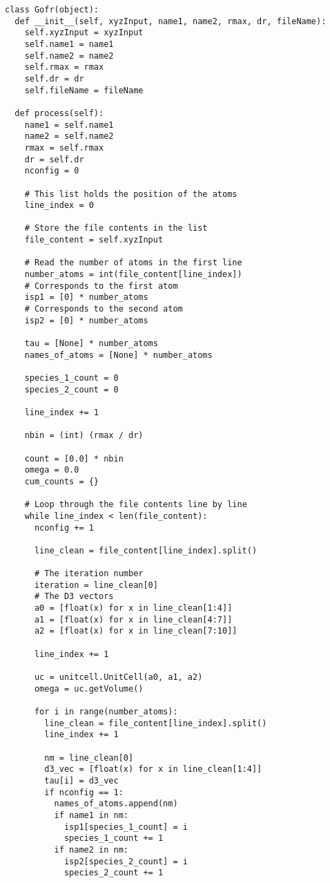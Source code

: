 \begin{verbatim}
class Gofr(object):
  def __init__(self, xyzInput, name1, name2, rmax, dr, fileName):
    self.xyzInput = xyzInput
    self.name1 = name1
    self.name2 = name2
    self.rmax = rmax
    self.dr = dr
    self.fileName = fileName
    
  def process(self):
    name1 = self.name1
    name2 = self.name2
    rmax = self.rmax
    dr = self.dr
    nconfig = 0
    
    # This list holds the position of the atoms
    line_index = 0
  
    # Store the file contents in the list
    file_content = self.xyzInput

    # Read the number of atoms in the first line
    number_atoms = int(file_content[line_index])
    # Corresponds to the first atom
    isp1 = [0] * number_atoms
    # Corresponds to the second atom
    isp2 = [0] * number_atoms
    
    tau = [None] * number_atoms
    names_of_atoms = [None] * number_atoms
    
    species_1_count = 0
    species_2_count = 0
    
    line_index += 1
  
    nbin = (int) (rmax / dr)
  
    count = [0.0] * nbin
    omega = 0.0
    cum_counts = {}
    
    # Loop through the file contents line by line
    while line_index < len(file_content):
      nconfig += 1
    
      line_clean = file_content[line_index].split()

      # The iteration number
      iteration = line_clean[0]
      # The D3 vectors
      a0 = [float(x) for x in line_clean[1:4]]
      a1 = [float(x) for x in line_clean[4:7]]
      a2 = [float(x) for x in line_clean[7:10]]

      line_index += 1

      uc = unitcell.UnitCell(a0, a1, a2)
      omega = uc.getVolume()

      for i in range(number_atoms):
        line_clean = file_content[line_index].split()
        line_index += 1
      
        nm = line_clean[0]
        d3_vec = [float(x) for x in line_clean[1:4]]
        tau[i] = d3_vec
        if nconfig == 1:
          names_of_atoms.append(nm)
          if name1 in nm:
            isp1[species_1_count] = i
            species_1_count += 1
          if name2 in nm:
            isp2[species_2_count] = i
            species_2_count += 1
      

\end{verbatim}

